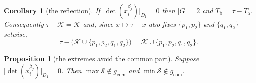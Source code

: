 \documentclass[10pt,a4paper]{amsart}
\newtheorem{corollary}{Corollary}
\newtheorem{proposition}{Proposition}
\begin{document}
\begin{corollary}[the reflection]\label{cor:reflectgen}
If $\bigl[\det(x_i^{\beta_j})\bigr]_{D_1}=0$ then $|G|=2$ and $T_{\mathrm b}=\tau-T_{\mathrm a}$.
Consequently $\tau-\mathcal{K}=\mathcal{K}$ and, since $x\mapsto\tau-x$ also fixes $\{p_1,p_2\}$ and
$\{q_1,q_2\}$ setwise,
\begin{equation}\label{eq:Ssymgen}
  \tau-\bigl(\mathcal{K}\cup\{p_1,p_2,q_1,q_2\}\bigr)=\mathcal{K}\cup\{p_1,p_2,q_1,q_2\}.
\end{equation}
\end{corollary}

\begin{proposition}[the extremes avoid the common part]\label{prop:A1gen}
Suppose $\bigl[\det(x_i^{\beta_j})\bigr]_{D_1}=0$. Then
$\max\mathcal{S}\notin g_{\mathrm{com}}$ and $\min\mathcal{S}\notin g_{\mathrm{com}}$.
\end{proposition}
\end{document}
